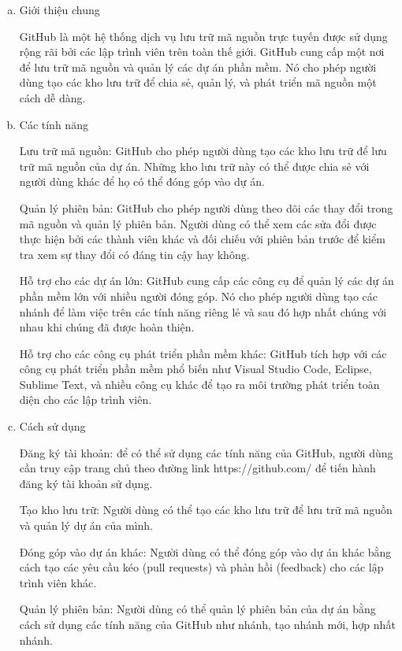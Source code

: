 \begin{enumerate}[a)]
  \item Giới thiệu chung
  
  GitHub là một hệ thống dịch vụ lưu trữ mã nguồn trực tuyến được sử dụng rộng rãi bởi các lập trình viên trên toàn thế giới. GitHub cung cấp một nơi để lưu trữ mã nguồn và quản lý các dự án phần mềm. Nó cho phép người dùng tạo các kho lưu trữ để chia sẻ, quản lý, và phát triển mã nguồn một cách dễ dàng.

  \item Các tính năng
  
Lưu trữ mã nguồn: GitHub cho phép người dùng tạo các kho lưu trữ để lưu trữ mã nguồn của dự án. Những kho lưu trữ này có thể được chia sẻ với người dùng khác để họ có thể đóng góp vào dự án.


Quản lý phiên bản: GitHub cho phép người dùng theo dõi các thay đổi trong mã nguồn và quản lý phiên bản. Người dùng có thể xem các sửa đổi được thực hiện bởi các thành viên khác và đối chiếu với phiên bản trước để kiểm tra xem sự thay đổi có đáng tin cậy hay không.


Hỗ trợ cho các dự án lớn: GitHub cung cấp các công cụ để quản lý các dự án phần mềm lớn với nhiều người đóng góp. Nó cho phép người dùng tạo các nhánh để làm việc trên các tính năng riêng lẻ và sau đó hợp nhất chúng với nhau khi chúng đã được hoàn thiện.


Hỗ trợ cho các công cụ phát triển phần mềm khác: GitHub tích hợp với các công cụ phát triển phần mềm phổ biến như Visual Studio Code, Eclipse, Sublime Text, và nhiều công cụ khác để tạo ra môi trường phát triển toàn diện cho các lập trình viên.



  \item Cách sử dụng
  
Đăng ký tài khoản: để có thể sử dụng các tính năng của GitHub, người dùng cần truy cập trang chủ theo đường link https://github.com/ để tiến hành đăng ký tài khoản sử dụng.


Tạo kho lưu trữ: Người dùng có thể tạo các kho lưu trữ để lưu trữ mã nguồn và quản lý dự án của mình.


	Đóng góp vào dự án khác: Người dùng có thể đóng góp vào dự án khác bằng cách tạo các yêu cầu kéo (pull requests) và phản hồi (feedback) cho các lập trình viên khác.


	Quản lý phiên bản: Người dùng có thể quản lý phiên bản của dự án bằng cách sử dụng các tính năng của GitHub như nhánh, tạo nhánh mới, hợp nhất nhánh.



\end{enumerate}
